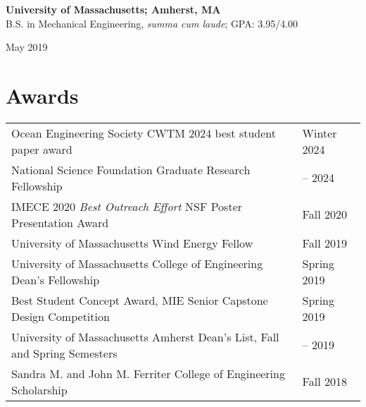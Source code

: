 \documentclass[letterpaper,11pt]{article}
\begin{document}
\vspace{7pt}

\begin{minipage}[t]{.80\textwidth}
\flushleft
\textbf{University of Massachusetts; Amherst, MA}\\
 B.S. in Mechanical Engineering, \textit{summa cum laude}; GPA: 3.95/4.00
\end{minipage}
\hfill
\begin{minipage}[t]{.19\textwidth}
\flushright
May 2019\\
\end{minipage}

\vspace{-1pt}

\section{Awards}
\vspace{-1pt}
{\selectfont
\begin{tabular}
  {>{\raggedright\arraybackslash}p{}%
   >{\raggedleft\arraybackslash}p{}%
  }
Ocean Engineering Society CWTM 2024 best student paper award & Winter 2024\\
National Science Foundation Graduate Research Fellowship & 2021 -- 2024\\ %
IMECE 2020 \textit{Best Outreach Effort} NSF Poster Presentation Award &	Fall 2020 \\
University of Massachusetts Wind Energy Fellow & Fall 2019\\
University of Massachusetts College of Engineering Dean's Fellowship  & Spring 2019\\ %
Best Student Concept Award, MIE Senior Capstone Design Competition & Spring 2019\\
University of Massachusetts Amherst Dean's List, Fall and Spring Semesters & 2015 -- 2019 \\
Sandra M. and John M. Ferriter College of Engineering Scholarship  & Fall 2018\\ %

\end{tabular}
}
\vspace{-4pt}

\end{document}
